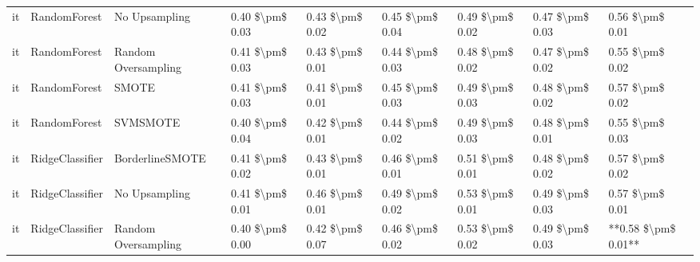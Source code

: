 \begin{tabular}{lllllllll}
      it &                    RandomForest &                 No Upsampling & 0.40 \$\textbackslash pm\$ 0.03 &           0.43 \$\textbackslash pm\$ 0.02 &       0.45 \$\textbackslash pm\$ 0.04 &        0.49 \$\textbackslash pm\$ 0.02 &                         0.47 \$\textbackslash pm\$ 0.03 &     0.56 \$\textbackslash pm\$ 0.01 \\
      it &                    RandomForest &           Random Oversampling & 0.41 \$\textbackslash pm\$ 0.03 &           0.43 \$\textbackslash pm\$ 0.01 &       0.44 \$\textbackslash pm\$ 0.03 &        0.48 \$\textbackslash pm\$ 0.02 &                         0.47 \$\textbackslash pm\$ 0.02 &     0.55 \$\textbackslash pm\$ 0.02 \\
      it &                    RandomForest &                         SMOTE & 0.41 \$\textbackslash pm\$ 0.03 &           0.41 \$\textbackslash pm\$ 0.01 &       0.45 \$\textbackslash pm\$ 0.03 &        0.49 \$\textbackslash pm\$ 0.03 &                         0.48 \$\textbackslash pm\$ 0.02 &     0.57 \$\textbackslash pm\$ 0.02 \\
      it &                    RandomForest &                      SVMSMOTE & 0.40 \$\textbackslash pm\$ 0.04 &           0.42 \$\textbackslash pm\$ 0.01 &       0.44 \$\textbackslash pm\$ 0.02 &        0.49 \$\textbackslash pm\$ 0.03 &                         0.48 \$\textbackslash pm\$ 0.01 &     0.55 \$\textbackslash pm\$ 0.03 \\
      it &                 RidgeClassifier &               BorderlineSMOTE & 0.41 \$\textbackslash pm\$ 0.02 &           0.43 \$\textbackslash pm\$ 0.01 &       0.46 \$\textbackslash pm\$ 0.01 &        0.51 \$\textbackslash pm\$ 0.01 &                         0.48 \$\textbackslash pm\$ 0.02 &     0.57 \$\textbackslash pm\$ 0.02 \\
      it &                 RidgeClassifier &                 No Upsampling & 0.41 \$\textbackslash pm\$ 0.01 &           0.46 \$\textbackslash pm\$ 0.01 &       0.49 \$\textbackslash pm\$ 0.02 &        0.53 \$\textbackslash pm\$ 0.01 &                         0.49 \$\textbackslash pm\$ 0.03 &     0.57 \$\textbackslash pm\$ 0.01 \\
      it &                 RidgeClassifier &           Random Oversampling & 0.40 \$\textbackslash pm\$ 0.00 &           0.42 \$\textbackslash pm\$ 0.07 &       0.46 \$\textbackslash pm\$ 0.02 &        0.53 \$\textbackslash pm\$ 0.02 &                         0.49 \$\textbackslash pm\$ 0.03 & **0.58 \$\textbackslash pm\$ 0.01** \\

\end{tabular}
